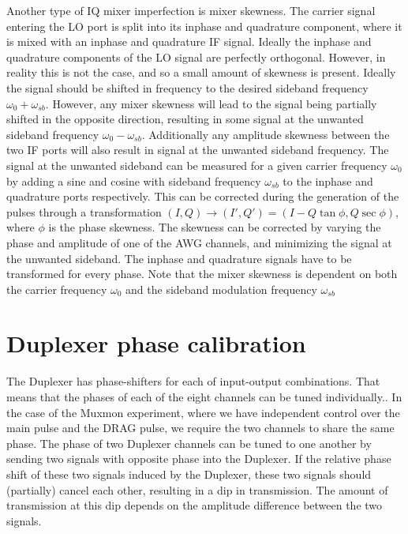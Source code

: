       Another type of IQ mixer imperfection is mixer skewness. The carrier signal entering the LO port is split into its inphase and quadrature component, where it is mixed with an inphase and quadrature IF signal. Ideally the inphase and quadrature components of the LO signal are perfectly orthogonal. However, in reality this is not the case, and so a small amount of skewness is present. Ideally the signal should be shifted in frequency to the desired sideband frequency $\omega_0 + \omega_{sb}$. However, any mixer skewness will lead to the signal being partially shifted in the opposite direction, resulting in some signal at the unwanted sideband frequency $\omega_0 - \omega_{sb}$. Additionally any amplitude skewness between the two IF ports will also result in signal at the unwanted sideband frequency. The signal at the unwanted sideband can be measured for a given carrier frequency $\omega_0$ by adding a sine and cosine with sideband frequency $\omega_{sb}$ to the inphase and quadrature ports respectively.   This can be corrected during the generation of the pulses through a transformation $\left( I, Q \right) \rightarrow \left( I', Q' \right) = \left( I - Q \tan{\phi}, Q \sec{\phi} \right)$, where $\phi$ is the phase skewness. The skewness can be corrected by varying the phase and amplitude of one of the AWG channels, and minimizing the signal at the unwanted sideband. The inphase and quadrature signals have to be transformed for every phase. Note that the mixer skewness is dependent on both the carrier frequency $\omega_0$ and the sideband modulation frequency $\omega_{sb}$

    \section{Duplexer phase calibration}
      \label{sec:Duplexer phase calibration}
      The Duplexer has phase-shifters for each of input-output combinations. That means that the phases of each of the eight channels can be tuned individually.. In the case of the Muxmon experiment, where we have independent control over the main pulse and the DRAG pulse, we require the two channels to share the same phase. The phase of two Duplexer channels can be tuned to one another by sending two signals with opposite phase into the Duplexer. If the relative phase shift of these two signals induced by the Duplexer, these two signals should (partially) cancel each other, resulting in a dip in transmission. The amount of transmission at this dip depends on the amplitude difference between the two signals.

